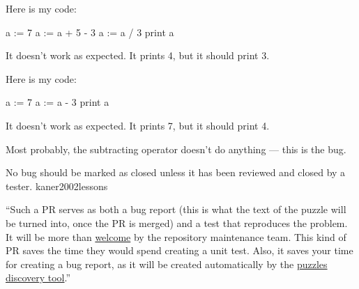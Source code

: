 \documentclass{article}
\begin{document}

\begin{pptWide}{2}
{\small\begin{ffcode}
Here is my code:

a := 7
a := a + 5 - 3
a := a / 3
print a

It doesn't work as expected.
It prints 4, but it should
print 3.
\end{ffcode}
}
\par\columnbreak\par
{\small\begin{ffcode}
Here is my code:

a := 7
a := a - 3
print a

It doesn't work as expected.
It prints 7, but it should
print 4.
\end{ffcode}
}
Most probably, the subtracting operator doesn't do anything --- this is the bug.
\end{pptWide}
\plush{}



  {No bug should be marked as closed unless it has been reviewed and closed by a tester.}
  {kaner2002lessons}


\begin{pptWide}{2}
{\small{}
}
\par\columnbreak\par
``Such a PR serves as both a bug report (this is what the text of the puzzle will be turned into, once the PR is merged) and a test that reproduces the problem. It will be more than \ul{welcome} by the repository maintenance team. This kind of PR saves the time they would spend creating a unit test. Also, it saves your time for creating a bug report, as it will be created automatically by the \ul{puzzles discovery tool}.''~\citep{bugayenko2023blog0725}
\end{pptWide}
\plush{}
\end{document}
